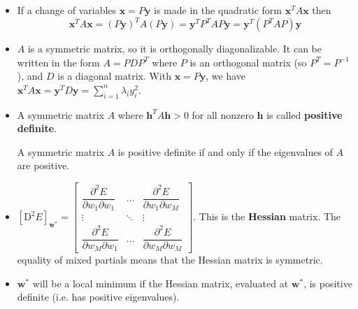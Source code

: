 \documentclass[12pt,letterpaper,noanswers]{exam}
\newcommand{\vc}[1]{\boldsymbol{#1}}
\begin{document}
\begin{tcolorbox}
    \begin{itemize}
    \item If a change of variables $\vc{x} = P\vc{y}$ is made in the quadratic form $\vc{x}^TA\vc{x}$ then
    \[\vc{x}^TA\vc{x} = (P\vc{y})^TA(P\vc{y}) = \vc{y}^TP^TAP\vc{y} = \vc{y}^T(P^TAP)\vc{y}\]
    \item $A$ is a symmetric matrix, so it is orthogonally diagonalizable.  It can be written in the form $A = PDP^T$ where $P$ is an orthogonal matrix (so $P^T=P^{-1}$), and $D$ is a diagonal matrix.  With $\vc{x} = P\vc{y}$, we have $\vc{x}^T A \vc{x} = \vc{y}^T D \vc{y} = \sum\limits_{i=1}^n \lambda_i y_i^2$.
    
    \item A symmetric matrix $A$ where $\vc{h}^TA\vc{h}>0$ for all nonzero $\vc{h}$ is called \textbf{positive definite}.
    
    A symmetric matrix $A$ is positive definite if and only if the eigenvalues of $A$ are positive.
 
    
    \item $\left[\text{D}^2E\right]_{\vc{w}^*} = \left[\begin{array}{ccc}
    \dfrac{\partial^2E}{\partial w_1 \partial w_1} & \hdots & \dfrac{\partial^2E}{\partial w_1 \partial w_M} \\
    \vdots & \ddots & \vdots \\
    
    \dfrac{\partial^2E}{\partial w_M \partial w_1} & \hdots & \dfrac{\partial^2E}{\partial w_M \partial w_M}
    \end{array}\right]$. This is the \textbf{Hessian} matrix.  The equality of mixed partials means that the Hessian matrix is symmetric.
    \item $\vc{w}^*$ will be a local minimum if the Hessian matrix, evaluated at $\vc{w}^*$, is positive definite (i.e. has positive eigenvalues).
\end{itemize}
\end{tcolorbox}
\end{document}
